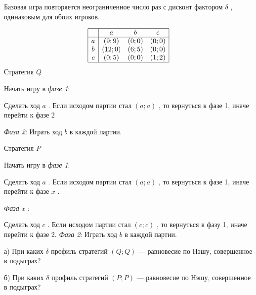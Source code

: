 \begin{problem}
 [LSE, 2002]

Базовая игра повторяется неограниченное число раз с дисконт фактором  $\delta $ , одинаковым для обоих игроков.

\[\begin{array}{|c|ccc|}  \hline {} & {a} & {b} & {c} \\  \hline {a} & {\left(9;9\right)} & {\left(0;0\right)} & {\left(0;0\right)} \\ {b} & {\left(12;0\right)} & {\left(6;5\right)} & {\left(0;0\right)} \\ {c} & {\left(0;5\right)} & {\left(0;0\right)} & {\left(1;2\right)} \\  \hline  \end{array}\]
Стратегия  $Q$\par
Начать игру в {\it фазе 1}:\par
Сделать ход  $a$ . Если исходом партии стал  $\left(a;a\right)$ , то вернуться к фазе 1, иначе перейти к фазе 2\par
{\it Фаза 2}: Играть ход  $b$  в каждой партии.\par

Стратегия  $P$\par
Начать игру в {\it фазе 1}:\par
Сделать ход  $a$ . Если исходом партии стал  $\left(a;a\right)$ , то вернуться к фазе 1, иначе перейти к фазе  $x$ .\par
{\it Фаза } $x$ :\par
Сделать ход  $c$ . Если исходом партии стал  $\left(c;c\right)$ , то вернуться в фазу 1, иначе перейти к фазе 2.
{\it Фаза 2}: Играть ход  $b$  в каждой партии.\par
а) При каких  $\delta $  профиль стратегий  $\left(Q;Q\right)$  — равновесие по Нэшу, совершенное в подыграх?\par
б) При каких  $\delta $  профиль стратегий  $\left(P;P\right)$  — равновесие по Нэшу, совершенное в подыграх?



\begin{sol}

\end{sol}
\end{problem}



